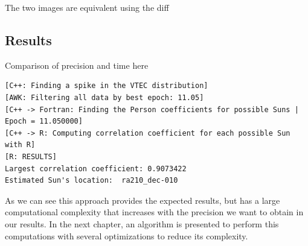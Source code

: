 The two images are equivalent using the diff




\subsection{Results}

Comparison of precision and time here



\begin{lstlisting}[caption=Brute force approach algorithm output]
[C++: Finding a spike in the VTEC distribution]
[AWK: Filtering all data by best epoch: 11.05]
[C++ -> Fortran: Finding the Person coefficients for possible Suns | Epoch = 11.050000]
[C++ -> R: Computing correlation coefficient for each possible Sun with R]
[R: RESULTS] 
Largest correlation coefficient: 0.9073422 
Estimated Sun's location:  ra210_dec-010
\end{lstlisting}

As we can see this approach provides the expected results, but has a large computational complexity that increases with the precision we want to obtain in our results. In the next chapter, an algorithm is presented to perform this computations with several optimizations to reduce its complexity.